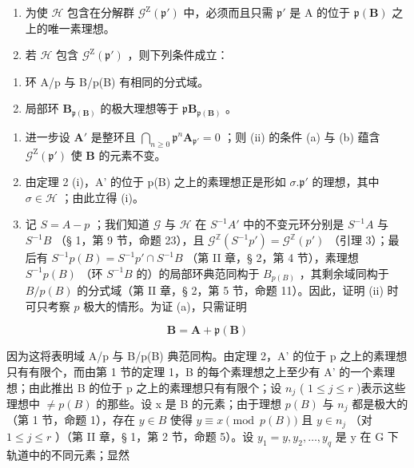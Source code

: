\begin{enumerate}
\def\labelenumi{(\roman{enumi})}
\item
  为使 \(\mathcal{H}\) 包含在分解群 \(\mathcal{G}^{\mathrm{Z}}(\mathfrak{p}')\) 中，必须而且只需 \(\mathfrak{p}'\) 是 A 的位于 \(\mathfrak{p}(\mathbf{B})\) 之上的唯一素理想。
\item
  若 \(\mathcal{H}\) 包含 \(\mathcal{G}^{\mathrm{Z}}(\mathfrak{p}')\) ，则下列条件成立：
\end{enumerate}

\begin{enumerate}
\def\labelenumi{(\alph{enumi})}
\item
  环 A/p 与 B/p(B) 有相同的分式域。
\item
  局部环 \(\mathbf{B}_{\mathfrak{p}(\mathbf{B})}\) 的极大理想等于 \(\mathfrak{p}\mathbf{B}_{\mathfrak{p}(\mathbf{B})}\) 。
\end{enumerate}

\begin{enumerate}
\def\labelenumi{(\roman{enumi})}
\setcounter{enumi}{2}
\item
  进一步设 \(\mathbf{A}'\) 是整环且 \(\bigcap_{n\geqslant 0}\mathfrak{p}^n\mathbf{A}_{\mathfrak{p}'} = 0\) ；则 (ii) 的条件 (a) 与 (b) 蕴含 \(\mathcal{G}^{\mathrm{Z}}(\mathfrak{p}')\) 使 \(\mathbf{B}\) 的元素不变。

\setcounter{enumi}{0}
\item
  由定理 2 (i)，A' 的位于 p(B) 之上的素理想正是形如 \(\sigma. \mathfrak{p}'\) 的理想，其中 \(\sigma \in \mathcal{H}\) ；由此立得 (i)。

\item
  记 \(S = A - p\) ；我们知道 \(\mathcal{G}\) 与 \(\mathcal{H}\) 在 \(S^{-1}A'\) 中的不变元环分别是 \(S^{-1}A\) 与 \(S^{-1}B\) （§ 1，第 9 节，命题 23），且 \(\mathcal{G}^{\mathbb{Z}}(S^{-1}p') = \mathcal{G}^{\mathbb{Z}}(p')\) （引理 3）；最后有 \(S^{-1}p(B) = S^{-1}p' \cap S^{-1}B\) （第 II 章，§ 2，第 4 节），素理想 \(S^{-1}p(B)\) （环 \(S^{-1}B\) 的）的局部环典范同构于 \(B_{p(B)}\) ，其剩余域同构于 \(B/p(B)\) 的分式域（第 II 章，§ 2，第 5 节，命题 11）。因此，证明 (ii) 时可只考察 \(p\) 极大的情形。为证 (a)，只需证明
\end{enumerate}

\[
\mathbf {B} = \mathbf {A} + \mathfrak {p} (\mathbf {B})\tag{3}
\]

因为这将表明域 A/p 与 B/p(B) 典范同构。由定理 2，A' 的位于 p 之上的素理想只有有限个，而由第 1 节的定理 1，B 的每个素理想之上至少有 A' 的一个素理想；由此推出 B 的位于 p 之上的素理想只有有限个；设 \(n_{j}\) ( \(1 \leqslant j \leqslant r\) )表示这些理想中 \(\neq p(B)\) 的那些。设 x 是 B 的元素；由于理想 \(p(B)\) 与 \(n_{j}\) 都是极大的（第 1 节，命题 1），存在 \(y \in B\) 使得 \(y \equiv x \pmod{p(B)}\) 且 \(y \in n_{j}\) （对 \(1 \leqslant j \leqslant r\) ）（第 II 章，§ 1，第 2 节，命题 5）。设 \(y_{1} = y, y_{2}, \ldots, y_{q}\) 是 y 在 G 下轨道中的不同元素；显然

